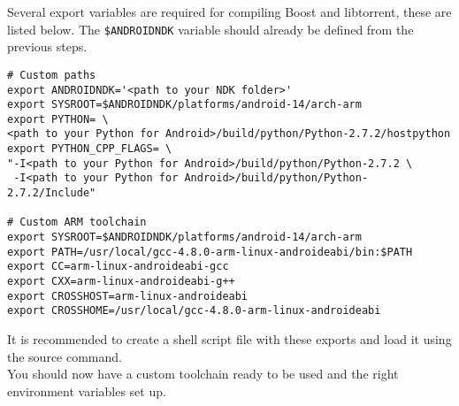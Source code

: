 	Several export variables are required for compiling Boost and libtorrent, these are listed below. The \texttt{\$ANDROIDNDK} variable should already be defined from the previous steps.
	\begin{lstlisting}
# Custom paths
export ANDROIDNDK='<path to your NDK folder>'
export SYSROOT=$ANDROIDNDK/platforms/android-14/arch-arm
export PYTHON= \ 
<path to your Python for Android>/build/python/Python-2.7.2/hostpython
export PYTHON_CPP_FLAGS= \
"-I<path to your Python for Android>/build/python/Python-2.7.2 \
 -I<path to your Python for Android>/build/python/Python-2.7.2/Include"
	 
# Custom ARM toolchain
export SYSROOT=$ANDROIDNDK/platforms/android-14/arch-arm
export PATH=/usr/local/gcc-4.8.0-arm-linux-androideabi/bin:$PATH
export CC=arm-linux-androideabi-gcc
export CXX=arm-linux-androideabi-g++
export CROSSHOST=arm-linux-androideabi
export CROSSHOME=/usr/local/gcc-4.8.0-arm-linux-androideabi
	\end{lstlisting}
	It is recommended to create a shell script file with these exports and load it using the source command.\\
	You should now have a custom toolchain ready to be used and the right environment variables set up.